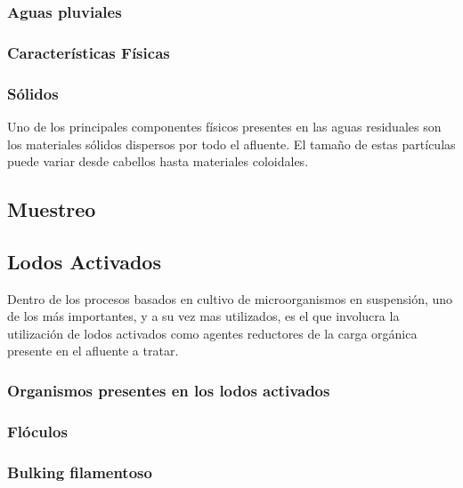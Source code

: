 \subsubsection*{Aguas pluviales}

\subsubsection{Características Físicas}
\subsubsection*{Sólidos}
Uno de los principales componentes físicos presentes en las aguas residuales son los materiales sólidos dispersos por todo el afluente. El tamaño de estas partículas puede variar desde cabellos hasta materiales coloidales. 
\subsection{Muestreo}
\subsection{Lodos Activados}
Dentro de los procesos basados en cultivo de microorganismos en suspensión, uno de los más importantes, y a su vez mas utilizados, es el que involucra la utilización de lodos activados como agentes reductores de la carga orgánica presente en el afluente a tratar.
\subsubsection{Organismos presentes en los lodos activados}
\subsubsection{Flóculos}
\subsubsection{Bulking filamentoso}

